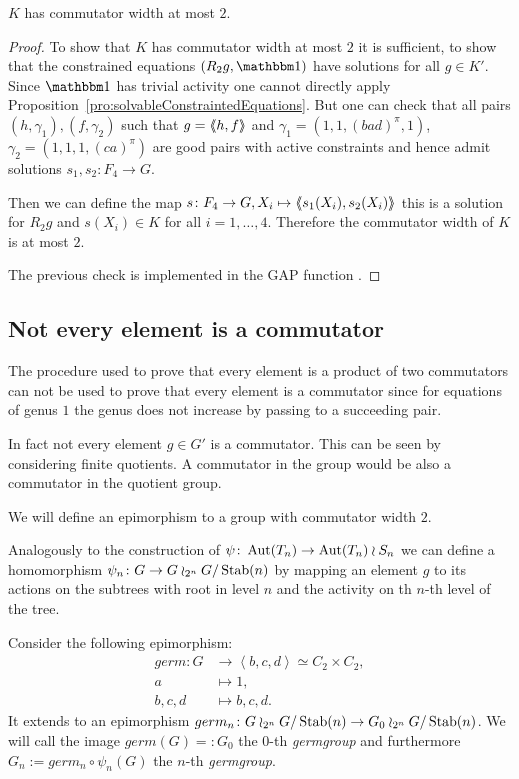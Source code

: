 \documentclass[a4paper,11pt]{amsart}
\begin{document}
\begin{cor}\label{cor:KhasCW2}
 $K$ has commutator width at most $2$. 
\end{cor}
\begin{proof}
 To show that $K$ has commutator width at most $2$ it is sufficient, to show that 
 the constrained equations $(R_2g,\id)$ have solutions for all $g\in K'$. 
 Since $\id$ has trivial activity one cannot directly apply 
 Proposition~\ref{pro:solvableConstraintedEquations}.  But one can check that all 
 pairs $(h,\gamma_1),(f,\gamma_2)$ such that $g=\langle\negthickspace\langle h,f\rangle\negthickspace\rangle$ and
 $\gamma_1=(1,1,(bad)^\pi,1)$, $\gamma_2=(1,1,1,(ca)^\pi)$ are good pairs with active
 constraints and hence admit solutions $s_1,s_2\colon F_4\to G$.
 
 Then we can define the map $s\colon F_4\to G, X_i\mapsto \langle\negthickspace\langle s_1(X_i),s_2(X_i)\rangle\negthickspace\rangle$ this is a solution
 for $R_2g$ and $s(X_i)\in K$ for all $i=1,\ldots,4$. Therefore the commutator width of $K$ is at most $2$.
 
 The previous check is implemented in the GAP function . 
\end{proof}

\subsection{Not every element is a commutator}
The procedure used to prove that every element is a product of two commutators 
can not be used to prove that every element is a
commutator since for equations of genus $1$ the 
genus does not increase by passing to a succeeding pair. 

In fact not every element $g\in G'$ is a commutator. This can be seen by
considering finite quotients. A commutator in the group would be also a
commutator in the quotient group. 

We will define an epimorphism to a group with commutator width $2$.

Analogously to the construction of $\psi\colon \operatorname{{Aut}}(T_n )\to \operatorname{{Aut}}(T_n) \wr S_n$
we can define a homomorphism $\psi_n\colon G \to G\wr_{2^n} {G/\operatorname{Stab}(n)}$ by
mapping an element $g$ to its actions on the subtrees with root in level $n$
and the activity on th $n$-th level of the tree.

Consider the following epimorphism:
\begin{align*}
germ\colon G&\to\left<b,c,d\right>\simeq C_2\times C_2, \\
a&\mapsto 1,\\
b,c,d&\mapsto b,c,d.
\end{align*} It extends to 
an epimorphism $germ_n\colon G\wr_{2^n} {G/\operatorname{Stab}(n)}\to G_0\wr_{2^n} {G/\operatorname{Stab}(n)}$.
We will call the image $germ(G)=:G_0$ the $0$-th \emph{germgroup} and furthermore
$G_n := germ_n \circ \psi_n(G)$ the $n$-th \emph{germgroup}.
\end{document}
